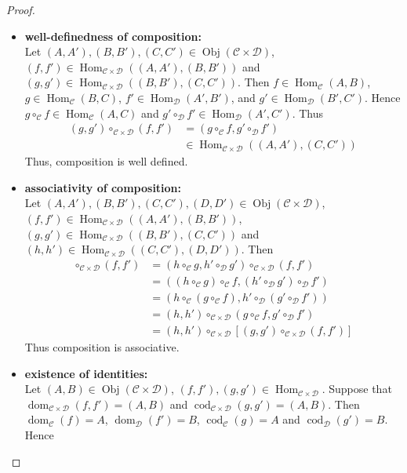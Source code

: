 \documentclass{book}
\theoremstyle{definition}
\newcommand{\MC}{\mathcal{C}}
\newcommand{\MD}{\mathcal{D}}
\DeclareMathOperator{\dom}{dom}
\DeclareMathOperator{\cod}{cod}
\DeclareMathOperator{\Obj}{Obj}
\DeclareMathOperator{\Hom}{Hom}
\DeclareMathOperator*{\0}{\mbf{0}}
\DeclareMathOperator*{\1}{\mbf{1}}
\begin{document}
	\begin{proof}\
		\begin{itemize}
			\item \textbf{well-definedness of composition: } \\ 
			Let $(A, A'), (B, B'), (C, C') \in \Obj(\MC \times \MD)$, $(f, f') \in \Hom_{\MC \times \MD}((A, A'), (B, B'))$ and $(g, g') \in \Hom_{\MC \times \MD}((B, B'), (C, C'))$. Then $f \in \Hom_{\MC}(A, B)$, $g \in \Hom_{\MC}(B, C)$, $f'  \in \Hom_{\MD}(A', B')$, and  $g' \in \Hom_{\MD}(B', C')$. Hence $g \circ_{\MC} f \in \Hom_{\MC}(A, C)$ and $g' \circ_{\MD} f' \in \Hom_{\MD}(A', C')$. Thus 
			\begin{align*}
				(g,g') \circ_{\MC \times \MD} (f, f') 
				&= (g \circ_{\MC} f, g' \circ_{\MD} f') \\
				& \in \Hom_{\MC \times \MD}((A, A'), (C, C'))
			\end{align*}
			Thus, composition is well defined. \\
			\item \textbf{associativity of composition:} \\
			Let $(A, A'), (B, B'), (C, C'), (D, D') \in \Obj(\MC \times \MD)$, $(f, f') \in \Hom_{\MC \times \MD}((A, A'), (B, B'))$, $(g, g') \in \Hom_{\MC \times \MD}((B, B'), (C, C'))$ and $(h, h') \in \Hom_{\MC \times \MD}((C, C'), (D, D'))$. Then 
			\begin{align*}
				[(h, h') \circ_{\MC \times \MD} (g , g') ] \circ_{\MC \times \MD} (f, f')
				& = (h \circ_{\MC} g, h' \circ_{\MD} g') \circ_{\MC \times \MD} (f, f') \\
				& = ((h \circ_{\MC} g) \circ_{\MC} f, (h' \circ_{\MD} g') \circ_{\MD} f') \\
				& = (h \circ_{\MC} ( g \circ_{\MC} f), h' \circ_{\MD} (g' \circ_{\MD} f')) \\
				& = (h, h') \circ_{\MC \times \MD} (g \circ_{\MC} f, g' \circ_{\MD} f') \\
				& = (h, h') \circ_{\MC \times \MD} [(g, g') \circ_{\MC \times \MD} (f, f')]
			\end{align*} 
			Thus composition is associative. \\
			\item \textbf{existence of identities: } \\
			Let $(A, B) \in \Obj(\MC \times \MD)$, $(f, f'), (g,g') \in \Hom_{\MC \times \MD}$. Suppose that $\dom_{\MC \times \MD}(f, f') = (A, B)$ and $\cod_{\MC \times \MD}(g, g') = (A, B)$. Then $\dom_{\MC}(f) = A$, $\dom_{\MD}(f') = B$, $\cod_{\MC}(g) = A$ and  $\cod_{\MD}(g') = B$. Hence

\end{itemize}
\end{proof}
\end{document}
